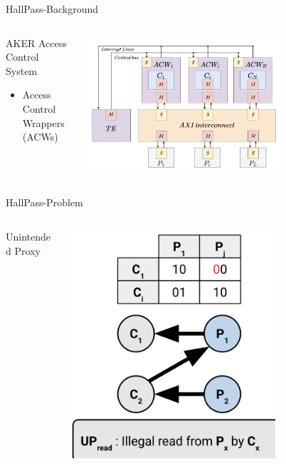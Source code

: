 \begin{frame}{HallPass-Background}
    \begin{columns}
        \begin{column}{0.5\textwidth}
            AKER Access Control System
            \begin{itemize}
                \item Access Control Wrappers (ACWs)
            \end{itemize}
        \end{column}
        \begin{column}{0.5\textwidth}
            \centering
            \includegraphics[height=0.7\textheight,width=0.7\textwidth,keepaspectratio]{aker.png}
        \end{column}
    \end{columns}
\end{frame}

\begin{frame}{HallPass-Problem}
    \begin{columns}
        \begin{column}{0.5\textwidth}
            Unintended Proxy
        \end{column}
        \begin{column}{0.5\textwidth}
            \centering
            \includegraphics[height=0.7\textheight,width=0.7\textwidth,keepaspectratio]{proxy.png}
        \end{column}
    \end{columns}
\end{frame}

